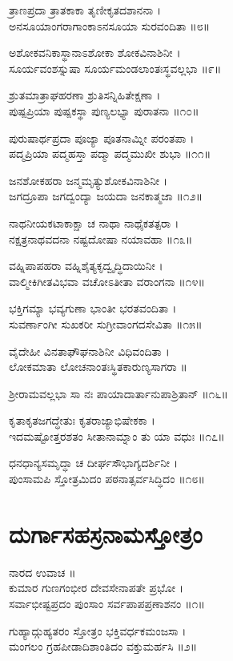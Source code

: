 ತ್ರಾಣಪ್ರದಾ ತ್ರಾತಕಾಕಾ ತೃಣೀಕೃತದಶಾನನಾ ।\\
ಅನಸೂಯಾಂಗರಾಗಾಂಕಾಽನಸೂಯಾ ಸುರವಂದಿತಾ ॥೮॥

ಅಶೋಕವನಿಕಾಸ್ಥಾನಾಽಶೋಕಾ ಶೋಕವಿನಾಶಿನೀ ।\\
ಸೂರ್ಯವಂಶಸ್ನುಷಾ ಸೂರ್ಯಮಂಡಲಾಂತಃಸ್ಥವಲ್ಲಭಾ ॥೯॥

ಶ್ರುತಮಾತ್ರಾಘಹರಣಾ ಶ್ರುತಿಸನ್ನಿಹಿತೇಕ್ಷಣಾ ।\\
ಪುಷ್ಪಪ್ರಿಯಾ ಪುಷ್ಪಕಸ್ಥಾ ಪುಣ್ಯಲಭ್ಯಾ ಪುರಾತನಾ ॥೧೦॥

ಪುರುಷಾರ್ಥಪ್ರದಾ ಪೂಜ್ಯಾ ಪೂತನಾಮ್ನೀ ಪರಂತಪಾ ।\\
ಪದ್ಮಪ್ರಿಯಾ ಪದ್ಮಹಸ್ತಾ ಪದ್ಮಾ ಪದ್ಮಮುಖೀ ಶುಭಾ ॥೧೧॥

ಜನಶೋಕಹರಾ ಜನ್ಮಮೃತ್ಯುಶೋಕವಿನಾಶಿನೀ ।\\
ಜಗದ್ರೂಪಾ ಜಗದ್ವಂದ್ಯಾ ಜಯದಾ ಜನಕಾತ್ಮಜಾ ॥೧೨॥

ನಾಥನೀಯಕಟಾಕಾಕ್ಷಾ ಚ ನಾಥಾ ನಾಥೈಕತತ್ಪರಾ ।\\
ನಕ್ಷತ್ರನಾಥವದನಾ ನಷ್ಟದೋಷಾ ನಯಾವಹಾ ॥೧೩॥

ವಹ್ನಿಪಾಪಹರಾ ವಹ್ನಿಶೈತ್ಯಕೃದ್ವೃದ್ಧಿದಾಯಿನೀ ।\\
ವಾಲ್ಮೀಕಿಗೀತವಿಭವಾ ವಚೋಽತೀತಾ ವರಾಂಗನಾ ॥೧೪॥

ಭಕ್ತಿಗಮ್ಯಾ ಭವ್ಯಗುಣಾ ಭಾಂತೀ ಭರತವಂದಿತಾ ।\\
ಸುವರ್ಣಾಂಗೀ ಸುಖಕರೀ ಸುಗ್ರೀವಾಂಗದಸೇವಿತಾ ॥೧೫॥

ವೈದೇಹೀ ವಿನತಾಘೌಘನಾಶಿನೀ ವಿಧಿವಂದಿತಾ ।\\
ಲೋಕಮಾತಾ ಲೋಚನಾಂತಃಸ್ಥಿತಕಾರುಣ್ಯಸಾಗರಾ ॥

ಶ್ರೀರಾಮವಲ್ಲಭಾ ಸಾ ನಃ ಪಾಯಾದಾರ್ತಾನುಪಾಶ್ರಿತಾನ್ ॥೧೬॥

ಕೃತಾಕೃತಜಗದ್ಧೇತುಃ ಕೃತರಾಜ್ಯಾಭಿಷೇಕಕಾ ।\\
ಇದಮಷ್ಟೋತ್ತರಶತಂ ಸೀತಾನಾಮ್ನಾಂ ತು ಯಾ ವಧುಃ ॥೧೭॥

ಧನಧಾನ್ಯಸಮೃದ್ಧಾ ಚ ದೀರ್ಘಸೌಭಾಗ್ಯದರ್ಶಿನೀ ।\\
ಪುಂಸಾಮಪಿ ಸ್ತೋತ್ರಮಿದಂ ಪಠನಾತ್ಸರ್ವಸಿದ್ಧಿದಂ ॥೧೮॥

\section{ದುರ್ಗಾಸಹಸ್ರನಾಮಸ್ತೋತ್ರಂ}

ನಾರದ ಉವಾಚ ॥\\
ಕುಮಾರ ಗುಣಗಂಭೀರ ದೇವಸೇನಾಪತೇ ಪ್ರಭೋ ।\\
ಸರ್ವಾಭೀಷ್ಟಪ್ರದಂ ಪುಂಸಾಂ ಸರ್ವಪಾಪಪ್ರಣಾಶನಂ ॥೧॥

ಗುಹ್ಯಾದ್ಗುಹ್ಯತರಂ ಸ್ತೋತ್ರಂ ಭಕ್ತಿವರ್ಧಕಮಂಜಸಾ ।\\
ಮಂಗಲಂ ಗ್ರಹಪೀಡಾದಿಶಾಂತಿದಂ ವಕ್ತುಮರ್ಹಸಿ ॥೨॥

